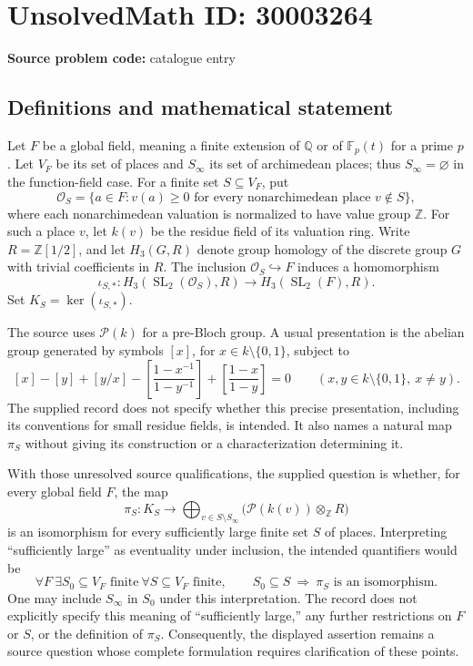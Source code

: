 \documentclass[11pt]{article}
\newcommand{\Z}{\mathbb{Z}}
\newcommand{\Q}{\mathbb{Q}}
\newcommand{\F}{\mathbb{F}}
\begin{document}
\section*{UnsolvedMath ID: 30003264}
\textbf{Source problem code:} catalogue entry
\subsection{Definitions and mathematical statement}
Let \(F\) be a global field, meaning a finite extension of \(\Q\) or of \(\F_p(t)\) for a prime \(p\). Let \(V_F\) be its set of places and \(S_\infty\) its set of archimedean places; thus \(S_\infty=\varnothing\) in the function-field case. For a finite set \(S\subseteq V_F\), put
\[
\mathcal O_S=\{a\in F: v(a)\geq 0\text{ for every nonarchimedean place }v\notin S\},
\]
where each nonarchimedean valuation is normalized to have value group \(\Z\). For such a place \(v\), let \(k(v)\) be the residue field of its valuation ring. Write \(R=\Z[1/2]\), and let \(H_3(G,R)\) denote group homology of the discrete group \(G\) with trivial coefficients in \(R\). The inclusion \(\mathcal O_S\hookrightarrow F\) induces a homomorphism
\[
\iota_{S,*}:H_3(\operatorname{SL}_2(\mathcal O_S),R)\longrightarrow H_3(\operatorname{SL}_2(F),R).
\]
Set \(K_S=\ker(\iota_{S,*})\).

The source uses \(\mathcal P(k)\) for a pre-Bloch group. A usual presentation is the abelian group generated by symbols \([x]\), for \(x\in k\setminus\{0,1\}\), subject to
\[
[x]-[y]+[y/x]
-\left[\frac{1-x^{-1}}{1-y^{-1}}\right]
+\left[\frac{1-x}{1-y}\right]=0
\qquad(x,y\in k\setminus\{0,1\},\ x\ne y).
\]
The supplied record does not specify whether this precise presentation, including its conventions for small residue fields, is intended. It also names a natural map \(\pi_S\) without giving its construction or a characterization determining it.

With those unresolved source qualifications, the supplied question is whether, for every global field \(F\), the map
\[
\pi_S:K_S\longrightarrow
\bigoplus_{v\in S\setminus S_\infty}
\bigl(\mathcal P(k(v))\otimes_{\Z}R\bigr)
\]
is an isomorphism for every sufficiently large finite set \(S\) of places. Interpreting ``sufficiently large'' as eventuality under inclusion, the intended quantifiers would be
\[
\forall F\ \exists S_0\subseteq V_F\text{ finite}\ \forall S\subseteq V_F\text{ finite},\qquad
S_0\subseteq S\ \Longrightarrow\ \pi_S\text{ is an isomorphism}.
\]
One may include \(S_\infty\) in \(S_0\) under this interpretation. The record does not explicitly specify this meaning of ``sufficiently large,'' any further restrictions on \(F\) or \(S\), or the definition of \(\pi_S\). Consequently, the displayed assertion remains a source question whose complete formulation requires clarification of these points.
\end{document}
